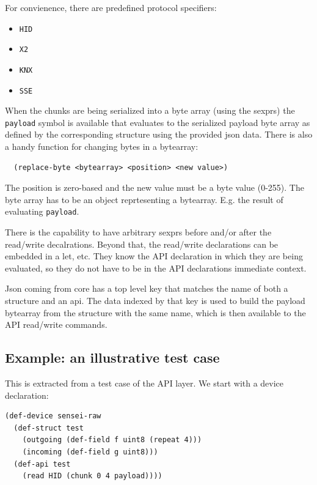 \documentclass[12pt]{article}
\begin{document}
For convienence, there are predefined protocol specifiers:

\begin{itemize}
\item \verb|HID|
\item \verb|X2|
\item \verb|KNX|
\item \verb|SSE|
\end{itemize}

When the chunks are being serialized into a byte array (using the
sexprs) the \verb|payload| symbol is available that evaluates to the
serialized payload byte array as defined by the corresponding
structure using the provided json data. There is also a handy function
for changing bytes in a bytearray:

\begin{verbatim}
  (replace-byte <bytearray> <position> <new value>)
\end{verbatim}

The position is zero-based and the new value must be a byte value
(0-255). The byte array has to be an object reprtesenting a bytearray.
E.g. the result of evaluating \verb|payload|.

There is the capability to have arbitrary sexprs before and/or after
the read/write decalrations. Beyond that, the read/write declarations
can be embedded in a let, etc. They know the API declaration in which
they are being evaluated, so they do not have to be in the API
declarations immediate context.

Json coming from core has a top level key that matches the name of
both a structure and an api. The data indexed by that key is used to
build the payload bytearray from the structure with the same name,
which is then available to the API read/write commands.

\subsection{Example: an illustrative test case}

This is extracted from a test case of the API layer.  We start with a device declaration:

\begin{verbatim}
(def-device sensei-raw 
  (def-struct test 
    (outgoing (def-field f uint8 (repeat 4)))
    (incoming (def-field g uint8)))
  (def-api test
    (read HID (chunk 0 4 payload))))
\end{verbatim}
\end{document}
